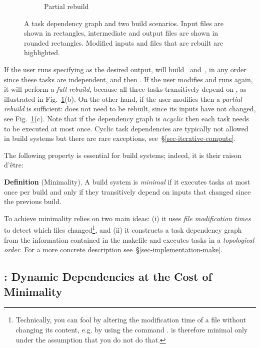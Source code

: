 \begin{figure}
\begin{subfigure}[b]{0.32\linewidth}
\caption{Partial rebuild}
\end{subfigure}
\caption{A task dependency graph and two build scenarios. Input files are shown
in rectangles, intermediate and output files are shown in rounded rectangles.
Modified inputs and files that are rebuilt are highlighted.
\label{fig-make}}
\end{figure}

If the user runs \Make specifying  as the desired output, \Make
will build~ and~, in any order since these tasks are
independent, and then . If the user modifies  and runs
\Make again, it will perform a \emph{full rebuild}, because all three tasks
transitively depend on , as illustrated in Fig.~\ref{fig-make}(b).
On the other hand, if the user modifies  then a \emph{partial
rebuild} is sufficient:  does not need to be rebuilt, since its
inputs have not changed, see Fig.~\ref{fig-make}(c). Note that if the dependency
graph is \emph{acyclic} then each task needs to be executed at most once. Cyclic
task dependencies are typically not allowed in build systems but there are rare
exceptions, see~\S\ref{sec-iterative-compute}.

\noindent
The following property is essential for build systems; indeed, it is their
raison d'\^etre:

\textbf{Definition} (Minimality). A build system is \emph{minimal} if it
executes tasks at most once per build and only if they transitively depend on
inputs that changed since the previous build.\label{def-minimal}
\vspace{2mm}

To achieve minimality \Make relies on two main ideas: (i) it uses \emph{file
modification times} to detect which files changed\footnote{Technically, you
can fool \Make by altering the modification time of a file without changing its
content, e.g. by using the command . \Make is therefore minimal only
under the assumption that you do not do that.}, and (ii) it constructs a task
dependency graph from the information contained in the makefile and executes
tasks in a \emph{topological order}. For a more concrete description
see~\S\ref{sec-implementation-make}.

\subsection{\Excel: Dynamic Dependencies at the Cost of Minimality}
\label{sec-background-excel}

